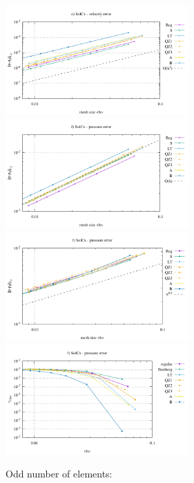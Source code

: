 \begin{center}
\includegraphics[width=7cm]{python_codes/fieldstone_78/results/mms_solcx/even/errors_V}
\includegraphics[width=7cm]{python_codes/fieldstone_78/results/mms_solcx/even/errors_P}\\
\includegraphics[width=7cm]{python_codes/fieldstone_78/results/mms_solcx/even/errors_Q}
\includegraphics[width=7cm]{python_codes/fieldstone_78/results/mms_solcx/even/vrms.pdf}
\end{center}

Odd number of elements:

